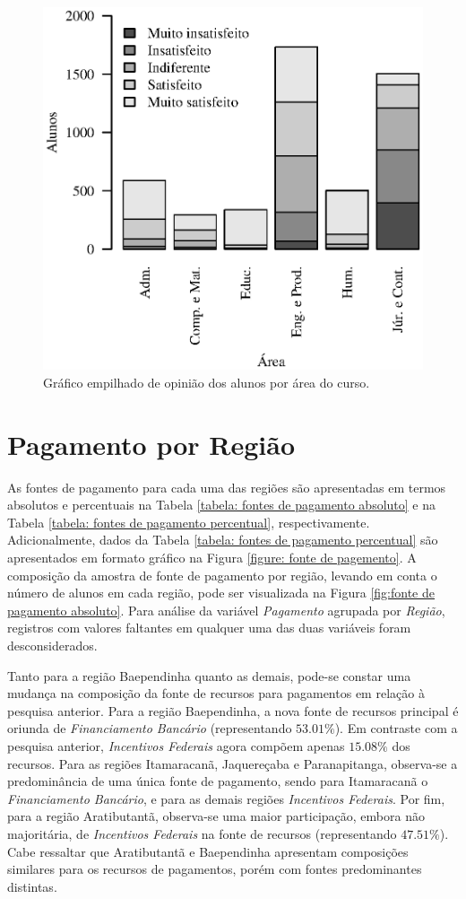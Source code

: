 \documentclass[10pt,a4paper,oneside]{article}
\newcommand{\arat}{Aratibutantã\xspace}
\newcommand{\baep}{Baependinha\xspace}
\newcommand{\itam}{Itamaracanã\xspace}
\newcommand{\jaqu}{Jaquereçaba\xspace}
\newcommand{\para}{Paranapitanga\xspace}
\begin{document}
\begin{figure}[!h]
	\centering
	\includegraphics[width=.6\linewidth]{plots/stacked_opiniao_por_area.eps}
	\caption{Gráfico empilhado de opinião dos alunos por área do curso.}
	\label{fig:stacked-opiniao-por-area}
\end{figure}


\FloatBarrier
\section{Pagamento por Região}
\label{section:pagamento-regiao}

As fontes de pagamento para cada uma das regiões são apresentadas em termos absolutos e percentuais na Tabela \ref{tabela: fontes de pagamento absoluto} e na Tabela \ref{tabela: fontes de pagamento percentual}, respectivamente. Adicionalmente, dados da Tabela \ref{tabela: fontes de pagamento percentual} são apresentados em formato gráfico na Figura \ref{figure: fonte de pagemento}. A composição da amostra de fonte de pagamento por região, levando em conta o número de alunos em cada região, pode ser visualizada na Figura \ref{fig:fonte de pagamento absoluto}. Para análise da variável \textit{Pagamento} agrupada por \textit{Região}, registros com valores faltantes em qualquer uma das duas variáveis foram desconsiderados.

Tanto para a região \baep quanto as demais, pode-se constar uma mudança na composição da fonte de recursos para pagamentos em relação à pesquisa anterior. Para a região \baep, a nova fonte de recursos principal é oriunda de \textit{Financiamento Bancário} (representando $53.01\%$). Em contraste com a pesquisa anterior, \textit{Incentivos Federais} agora compõem apenas $15.08\%$ dos recursos. Para as regiões \itam, \jaqu e \para, observa-se a predominância de uma única fonte de pagamento, sendo para \itam o \textit{Financiamento Bancário}, e para as demais regiões \textit{Incentivos Federais}. Por fim, para a região \arat, observa-se uma maior participação, embora não majoritária, de \textit{Incentivos Federais} na fonte de recursos (representando $47.51\%$). Cabe ressaltar que \arat e \baep apresentam composições similares para os recursos de pagamentos, porém com fontes predominantes distintas.
\end{document}
